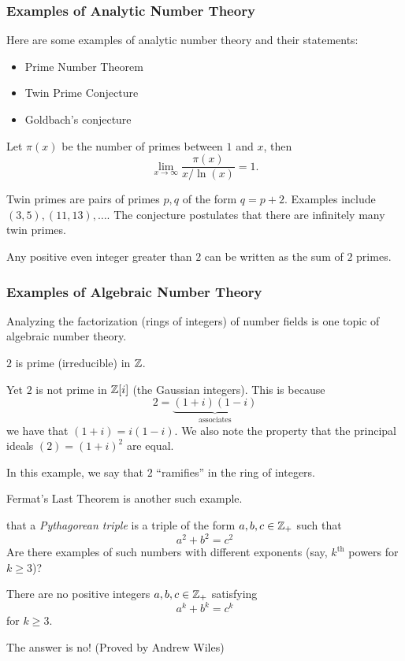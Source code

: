 \subsubsection{Examples of Analytic Number Theory}
Here are some examples of analytic number theory and their statements: 
\begin{itemize}
    \item Prime Number Theorem
    \item Twin Prime Conjecture
    \item Goldbach's conjecture
\end{itemize}
\begin{theorem}
    Let $\pi(x)$ be the number of primes between $1$ and $x$, then
    \begin{equation*}
        \lim_{x\to\infty} \frac{\pi(x)}{x / \ln(x)} = 1.
    \end{equation*}
\end{theorem}
\begin{conjecture}
    Twin primes are pairs of primes $p, q$ of the form $q=p+2$. Examples include $(3, 5), (11, 13), \dots$. The conjecture postulates that there are infinitely many twin primes. 
\end{conjecture}
\begin{conjecture}
    Any positive even integer greater than $2$ can be written as the sum of $2$ primes. 
\end{conjecture}

\subsubsection{Examples of Algebraic Number Theory}
Analyzing the factorization (rings of integers) of number fields is one topic of algebraic number theory. 
\begin{example}
    $2$ is prime (irreducible) in $\mathbb Z$. 

    Yet $2$ is not prime in $\mathbb Z[i]$ (the Gaussian integers). This is because 
    \[2 = \underbrace{(1+i)(1-i)}_{\text{associates}}\]
    we have that $(1+i) = i(1-i)$. We also note the property that the principal ideals $(2) = (1+i)^2$ are equal. 

    In this example, we say that $2$ ``ramifies'' in the ring of integers. 
\end{example}

Fermat's Last Theorem is another such example. 

\recall that a \emph{Pythagorean triple} is a triple of the form $a, b, c\in \mathbb Z_+$ such that 
\[a^2 + b^2 = c^2\]
Are there examples of such numbers with different exponents (say, $k^\mathrm{th}$ powers for $k\geq 3$)? 
\begin{theorem}
    There are no positive integers $a, b, c\in \mathbb Z_+$ satisfying 
    \[a^k + b^k = c^k\]
    for $k\geq 3$. 
\end{theorem}
The answer is no! (Proved by Andrew Wiles)

